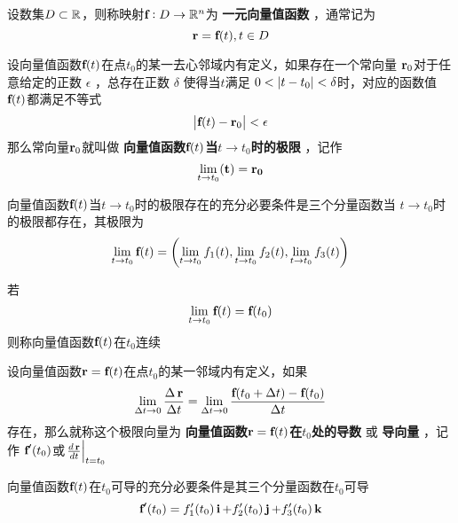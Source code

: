 \documentclass[11pt]{article}
\begin{document}
\begin{definition}[]
设数集\(D\subset\mathbb{R}\)，则称映射\(\operatorname{\textbf{f}}:D\to\mathbb{R}^n\)为 \textbf{一元向量值函数} ，通常记为
\begin{equation*}
\operatorname{\textbf{r}}=\operatorname{\textbf{f}}(t),t\in D
\end{equation*}
\end{definition}

\begin{definition}[]
设向量值函数\(\operatorname{\textbf{f}}(t)\)在点\(t_0\)的某一去心邻域内有定义，如果存在一个常向量
\(\operatorname{\textbf{r}}_0\)对于任意给定的正数 \(\epsilon\) ，总存在正数 \(\delta\) 使得当\(t\)满足
\(0<\abs{t-t_0}<\delta\)时，对应的函数值\(\operatorname{\textbf{f}}(t)\)都满足不等式
\begin{equation*}
\abs{\bff(t)-\br_0}<\epsilon
\end{equation*}
那么常向量\(\operatorname{\textbf{r}}_0\)就叫做 \textbf{向量值函数\(\operatorname{\textbf{f}}(t)\)当\(t\to t_0\)时的极限} ，记作
\begin{equation*}
\lim_{t\to t_0}\bf(t)=\operatorname{\textbf{r}}_0
\end{equation*}
\end{definition}
   向量值函数\(\operatorname{\textbf{f}}(t)\)当\(t\to t_0\)时的极限存在的充分必要条件是三个分量函数当
\(t\to t_0\)时的极限都存在，其极限为
\begin{equation*}
\lim_{t\to t_0}\operatorname{\textbf{f}}(t)=\left(
\lim_{t\to t_0}f_1(t),\lim_{t\to t_0}f_2(t),\lim_{t\to t_0}f_3(t)
\right)
\end{equation*}

若
\begin{equation*}
\lim_{t\to t_0}\operatorname{\textbf{f}}(t)=\operatorname{\textbf{f}}(t_0)
\end{equation*}
则称向量值函数\(\operatorname{\textbf{f}}(t)\)在\(t_0\)连续

\begin{definition}[]
设向量值函数\(\operatorname{\textbf{r}}=\operatorname{\textbf{f}}(t)\)在点\(t_0\)的某一邻域内有定义，如果
\begin{equation*}
\lim_{\Delta t\to0}\frac{\Delta \operatorname{\textbf{r}}}{\Delta t}=\lim_{\Delta t\to0}
\frac{\operatorname{\textbf{f}}(t_0+\Delta t)-\operatorname{\textbf{f}}(t_0)}{\Delta t}
\end{equation*}
存在，那么就称这个极限向量为 \textbf{向量值函数\(\operatorname{\textbf{r}}=\operatorname{\textbf{f}}(t)\)在\(t_0\)处的导数} 或
\textbf{导向量} ，记作 \(\operatorname{\textbf{f}}'(t_0)\)或\(\left.\frac{d\operatorname{\textbf{r}}}{dt}\right\rvert_{t=t_0}\)
\end{definition}

向量值函数\(\operatorname{\textbf{f}}(t)\)在\(t_0\)可导的充分必要条件是其三个分量函数在\(t_0\)可导
\begin{equation*}
\operatorname{\textbf{f}}'(t_0)=f_1'(t_0)\operatorname{\textbf{i}}+f_2'(t_0)\operatorname{\textbf{j}}+f_3'(t_0)\operatorname{\textbf{k}}
\end{equation*}
\end{document}
